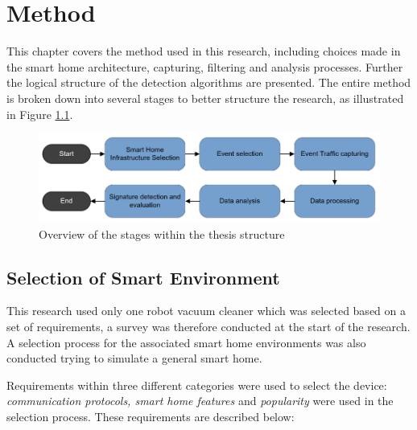 \chapter{Method}
\label{cap:Method}
This chapter covers the method used in this research, including choices made in the smart home architecture, capturing, filtering and analysis processes. Further the logical structure of the detection algorithms are presented. The entire method is broken down into several stages to better structure the research, as illustrated in Figure \ref{fig:Method_process}.  

\begin{figure}[H]
    \centering
    \includegraphics[width=\textwidth]{figures/Method_process.png}
    \caption{Overview of the stages within the thesis structure}
    \label{fig:Method_process}
\end{figure}



\section{Selection of Smart Environment}
This research used only one robot vacuum cleaner which was selected based on a set of requirements, a survey was therefore conducted at the start of the research. A selection process for the associated smart home environments was also conducted trying to simulate a general smart home.

Requirements within three different categories were used to select the device: \textit{communication protocols, smart home features} and \textit{popularity} were used in the selection process. These requirements are described below:  

